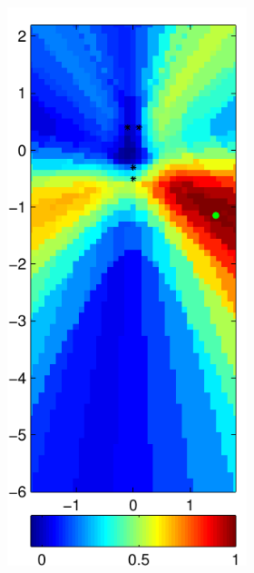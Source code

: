 \documentclass[spanish,openright]{book}
\begin{document}
\begin{figure}
\centering
\begin{subfigure}[t]{0.47\textwidth}
\begin{minipage}[t]{\textwidth}
\begin{subfigure}[t]{0.3\textwidth}
\includegraphics[width=\textwidth]{Pattern_Fo1500_pos01}

\end{subfigure}
\end{minipage}
\end{subfigure}
\end{figure}
\end{document}
